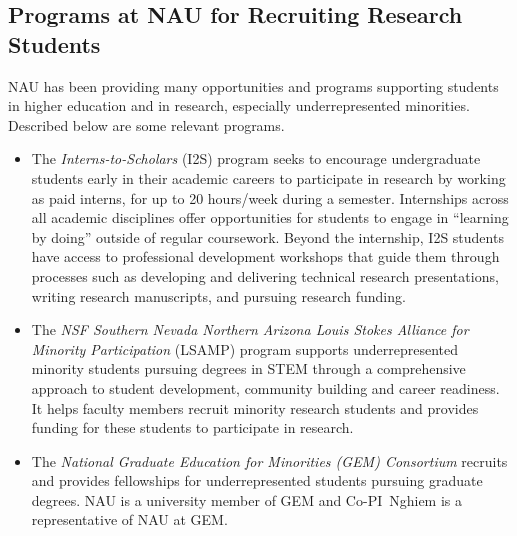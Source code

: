 \documentclass[12pt]{article}
\begin{document}
\subsection*{Programs at NAU for Recruiting Research Students}

NAU has been providing many opportunities and programs supporting students in higher education and in research, especially underrepresented minorities.
Described below are some relevant programs.
\begin{itemize}
\item The \textsl{Interns-to-Scholars} (I2S) program seeks to encourage undergraduate students early in their academic careers to participate in %
  research %
  by working as paid interns, for up to 20 hours/week during a semester.
  Internships across all academic disciplines offer opportunities for students to engage in ``learning by doing'' outside of regular coursework.
  Beyond the internship, I2S students have access to professional development workshops that guide them through processes such as developing and delivering technical research presentations, writing research manuscripts, and pursuing research funding.

\item The \textsl{NSF Southern Nevada Northern Arizona Louis Stokes Alliance for Minority Participation} (LSAMP) program supports underrepresented minority students pursuing degrees in STEM through a comprehensive approach to student development, community building and career readiness.  It helps faculty members recruit minority research students and provides funding for these students to participate in research.

\item The \textsl{National Graduate Education for Minorities (GEM) Consortium} recruits and provides fellowships for underrepresented students pursuing graduate degrees.  NAU is a university member of GEM and Co-PI~Nghiem is a representative of NAU at GEM.
\end{itemize}
\end{document}
